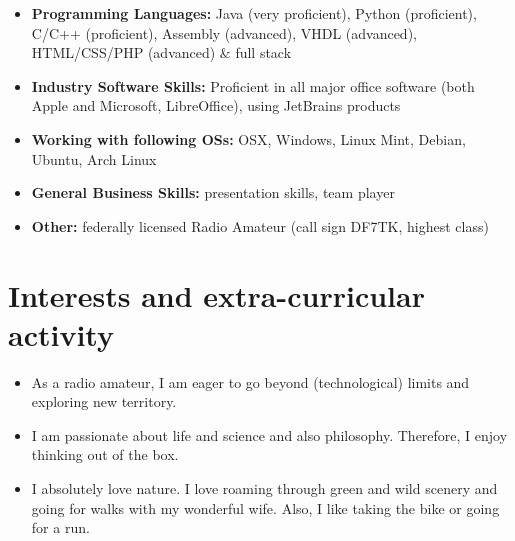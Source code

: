 \documentclass[11pt,a4paper,sans]{moderncv}        %
\begin{document}
\begin{itemize}

\item \textbf{Programming Languages:} Java (very proficient), Python (proficient), C/C++ (proficient), Assembly (advanced), VHDL (advanced), HTML/CSS/PHP (advanced) \& full stack

\vspace{6pt}



\item \textbf{Industry Software Skills:} Proficient in all major office software (both Apple and Microsoft, LibreOffice), using JetBrains products

\vspace{6pt}

\item \textbf{Working with following OSs:}  OSX, Windows, Linux Mint, Debian, Ubuntu, Arch Linux

\vspace{6pt}

\item \textbf{General Business Skills:} presentation skills, team player

\vspace{6pt}

\item \textbf{Other:} federally licensed Radio Amateur (call sign DF7TK, highest class)

\end{itemize}

\section{Interests and extra-curricular activity}

\vspace{6pt}

\begin{itemize}

\item{As a radio amateur, I am eager to go beyond (technological) limits and exploring new territory.}

\vspace{6pt}

\item{I am passionate about life and science and also philosophy. Therefore, I enjoy thinking out of the box.}

\vspace{6pt}

\item{I absolutely love nature. I love roaming through green and wild scenery and going for walks with my wonderful wife. Also, I like taking the bike or going for a run.}

\end{itemize}
\end{document}
